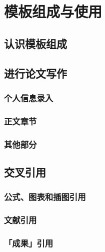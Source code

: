 \chapter{模板组成与使用}

\section{认识模板组成}
\section{进行论文写作}

\subsection{个人信息录入}
\subsection{正文章节}
\subsection{其他部分}
\section{交叉引用}

\subsection{公式、图表和插图引用}
\subsection{文献引用}
\subsection{「成果」引用}

